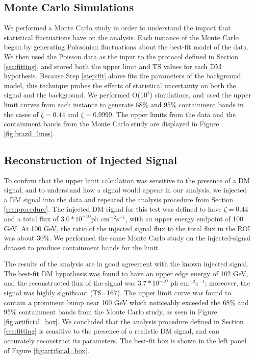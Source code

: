 \subsection{Monte Carlo Simulations\label{sec:MCMethods}}
We performed a Monte Carlo study in order to understand the impact that statistical fluctuations have on the analysis. 
Each instance of the Monte Carlo began by generating Poissonian fluctuations about the best-fit model of the data.
We then used the Poisson data as the input to the protocol defined in Section \ref{sec:fitting}, and stored both the upper limit and TS values for each DM hypothesis.
Because Step \ref{step:fit} above fits the parameters of the background model, this technique probes the effects of statistical uncertainty on both the signal and the background.
We performed O($10^3$) simulations, and used the upper limit curves from each instance to generate 68\% and 95\% containment bands in the cases of $\zeta = 0.44$ and $\zeta = 0.9999$.
The upper limits from the data and the containment bands from the Monte Carlo study are displayed in Figure \ref{fig:brazil_lines}.

\subsection{Reconstruction of Injected Signal\label{sec:injected}}
To confirm that the upper limit calculation was sensitive to the presence of a DM signal, and to understand how a signal would appear in our analysis, we injected a DM signal into the data and repeated the analysis procedure from Section \ref{sec:procedure}.
The injected DM signal for this test was defined to have $\zeta = 0.44$ and a total flux of $3.0*10^{-10} $ph cm$^{-2} $s$^{-1}$, with an upper energy endpoint of 100 GeV.
At 100 GeV, the ratio of the injected signal flux to the total flux in the ROI was about 30\%.
We performed the same Monte Carlo study on the injected-signal dataset to produce containment bands for the limit.

The results of the analysis are in good agreement with the known injected signal.
The best-fit DM hypothesis was found to have an upper edge energy of 102 GeV, and the reconstructed flux of the signal was $3.7*10^{-10}$ ph cm$^{-2} $s$^{-1}$; moreover, the signal was highly significant (TS=167).
The upper limit curve was found to contain a prominent bump near 100 GeV which noticeably exceeded the 68\% and 95\% containment bands from the Monte Carlo study, as seen in Figure \ref{fig:artificial_box}.
We concluded that the analysis procedure defined in Section \ref{sec:fitting} is sensitive to the presence of a realistic DM signal, and can accurately reconstruct its parameters.
The best-fit box is shown in the left panel of Figure \ref{fig:artificial_box}.


